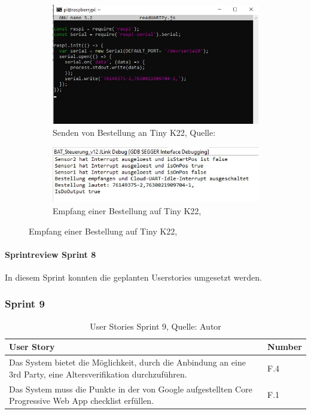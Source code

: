 \begin{figure}[H]
	\begin{subfigure}[b]{0.4\textwidth}
		\includegraphics[scale=0.4]{images/sendOrder.jpeg}
		\caption[Senden von Bestellung an Tiny K22]{Senden von Bestellung an Tiny K22, Quelle: \cite{arnoldPhilip:private}}
		\label{img: sendOrder}
	\end{subfigure}
	\hfill
	\begin{subfigure}[b]{0.4\textwidth}
		\includegraphics[scale=0.4]{images/uartEmpfangBestellung.jpeg}
		\caption[Empfang einer Bestellung auf Tiny K22]{Empfang einer Bestellung auf Tiny K22,  \cite{arnoldPhilip:private}}
		\label{img: uartEmpfangBestellung}
	\end{subfigure}
\end{figure} 
\paragraph{Sprintreview Sprint 8}
In diesem Sprint konnten die geplanten Userstories umgesetzt werden. 

\subsubsection{Sprint 9}
\begin{table}[H]
	\setlength\extrarowheight{2pt} %
	\begin{tabularx}{\textwidth}{|X|l|}
		\hline
		\textbf{User Story} & \textbf{Number} \\
		\hline
		Das System bietet die Möglichkeit, durch die Anbindung an eine 3rd Party, eine Altersverifikation durchzuführen.& F.4\\
		\hline
		Das System muss die Punkte in der von Google aufgestellten Core Progressive Web App checklist erfüllen. & F.1\\
		\hline
	\end{tabularx} 
	\caption[User Stories Sprint 9]{User Stories Sprint 9, Quelle: Autor}
\end{table}\label{userStoriesSprint9}

